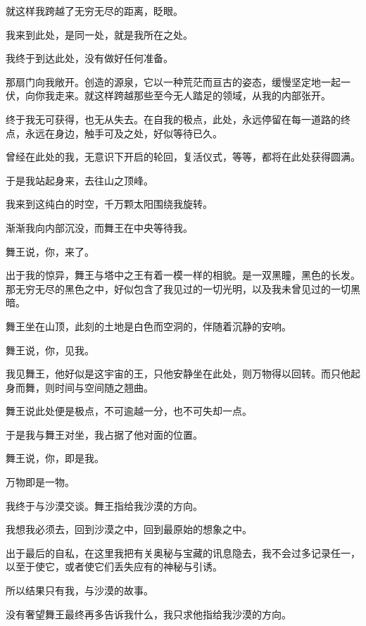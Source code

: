 \documentclass[UTF8]{article}
\begin{document}
\par 就这样我跨越了无穷无尽的距离，眨眼。
\par 我来到此处，是同一处，就是我所在之处。
\par 我终于到达此处，没有做好任何准备。
\par 那扇门向我敞开。创造的源泉，它以一种荒茫而亘古的姿态，缓慢坚定地一起一伏，向你我走来。就这样跨越那些至今无人踏足的领域，从我的内部张开。
\par 终于我无可获得，也无从失去。在自我的极点，此处，永远停留在每一道路的终点，永远在身边，触手可及之处，好似等待已久。
\par 曾经在此处的我，无意识下开启的轮回，复活仪式，等等，都将在此处获得圆满。
\par 于是我站起身来，去往山之顶峰。
\\[0.6cm]
\par 我来到这纯白的时空，千万颗太阳围绕我旋转。
\par 渐渐我向内部沉没，而舞王在中央等待我。
\\[0.6cm]
\par 舞王说，你，来了。
\par 出于我的惊异，舞王与塔中之王有着一模一样的相貌。是一双黑瞳，黑色的长发。那无穷无尽的黑色之中，好似包含了我见过的一切光明，以及我未曾见过的一切黑暗。
\par 舞王坐在山顶，此刻的土地是白色而空洞的，伴随着沉静的安响。
\\[0.6cm]
\par 舞王说，你，见我。
\par 我见舞王，他好似是这宇宙的王，只他安静坐在此处，则万物得以回转。而只他起身而舞，则时间与空间随之翘曲。
\par 舞王说此处便是极点，不可逾越一分，也不可失却一点。
\par 于是我与舞王对坐，我占据了他对面的位置。
\par 舞王说，你，即是我。
\\[0.6cm]
\par 万物即是一物。
\\[0.6cm]
\par 我终于与沙漠交谈。舞王指给我沙漠的方向。
\par 我想我必须去，回到沙漠之中，回到最原始的想象之中。
\par 出于最后的自私，在这里我把有关奥秘与宝藏的讯息隐去，我不会过多记录任一，以至于使它，或者使它们丢失应有的神秘与引诱。
\par 所以结果只有我，与沙漠的故事。
\par 没有奢望舞王最终再多告诉我什么，我只求他指给我沙漠的方向。
\end{document}
